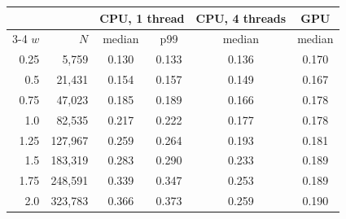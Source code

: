 \begin{tabular}{@{}r r c c c c@{}}
\toprule
 & & \multicolumn{2}{c}{CPU, 1 thread} & CPU, 4 threads & GPU \\
\cmidrule(lr){3-4}
$w$ & $N$ & median & p99 & median & median \\
\midrule
0.25 & 5,759 & 0.130 & 0.133 & 0.136 & 0.170 \\
0.5 & 21,431 & 0.154 & 0.157 & 0.149 & 0.167 \\
0.75 & 47,023 & 0.185 & 0.189 & 0.166 & 0.178 \\
1.0 & 82,535 & 0.217 & 0.222 & 0.177 & 0.178 \\
1.25 & 127,967 & 0.259 & 0.264 & 0.193 & 0.181 \\
1.5 & 183,319 & 0.283 & 0.290 & 0.233 & 0.189 \\
1.75 & 248,591 & 0.339 & 0.347 & 0.253 & 0.189 \\
2.0 & 323,783 & 0.366 & 0.373 & 0.259 & 0.190 \\
\bottomrule
\end{tabular}
